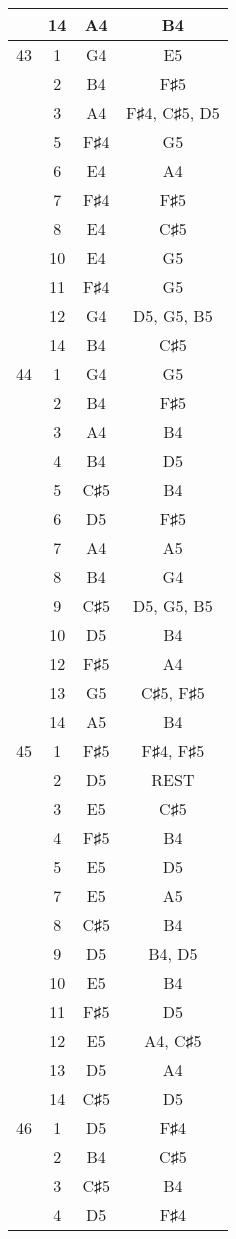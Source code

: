\documentclass{article}
\begin{document}
\begin{longtable}{|c|c|c|c|}
  & 14 & A4 & B4 \\ 
\hline
43 & 1 & G4 & E5 \\ 
  & 2 & B4 & F♯5 \\ 
  & 3 & A4 & F♯4, C♯5, D5 \\ 
  & 5 & F♯4 & G5 \\ 
  & 6 & E4 & A4 \\ 
  & 7 & F♯4 & F♯5 \\ 
  & 8 & E4 & C♯5 \\ 
  & 10 & E4 & G5 \\ 
  & 11 & F♯4 & G5 \\ 
  & 12 & G4 & D5, G5, B5 \\ 
  & 14 & B4 & C♯5 \\ 
\hline
44 & 1 & G4 & G5 \\ 
  & 2 & B4 & F♯5 \\ 
  & 3 & A4 & B4 \\ 
  & 4 & B4 & D5 \\ 
  & 5 & C♯5 & B4 \\ 
  & 6 & D5 & F♯5 \\ 
  & 7 & A4 & A5 \\ 
  & 8 & B4 & G4 \\ 
  & 9 & C♯5 & D5, G5, B5 \\ 
  & 10 & D5 & B4 \\ 
  & 12 & F♯5 & A4 \\ 
  & 13 & G5 & C♯5, F♯5 \\ 
  & 14 & A5 & B4 \\ 
\hline
45 & 1 & F♯5 & F♯4, F♯5 \\ 
  & 2 & D5 & REST \\ 
  & 3 & E5 & C♯5 \\ 
  & 4 & F♯5 & B4 \\ 
  & 5 & E5 & D5 \\ 
  & 7 & E5 & A5 \\ 
  & 8 & C♯5 & B4 \\ 
  & 9 & D5 & B4, D5 \\ 
  & 10 & E5 & B4 \\ 
  & 11 & F♯5 & D5 \\ 
  & 12 & E5 & A4, C♯5 \\ 
  & 13 & D5 & A4 \\ 
  & 14 & C♯5 & D5 \\ 
\hline
46 & 1 & D5 & F♯4 \\ 
  & 2 & B4 & C♯5 \\ 
  & 3 & C♯5 & B4 \\ 
  & 4 & D5 & F♯4 \\ 

\end{longtable}
\end{document}
